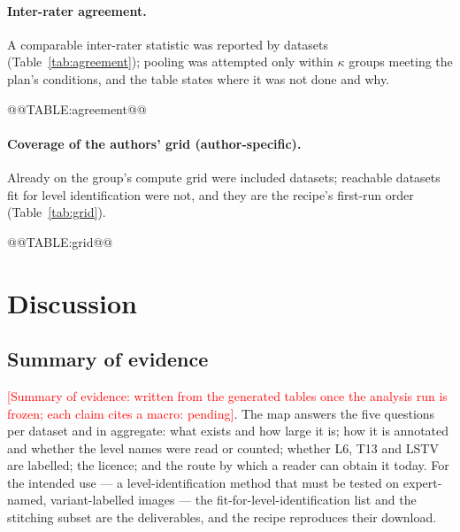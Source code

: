 \documentclass[11pt,a4paper]{article}
\newcommand{\pending}[1]{\textcolor{red}{[#1: pending]}}
\newcommand{\tabref}[1]{Table~\ref{tab:#1}}
\begin{document}
\paragraph{Inter-rater agreement.} A comparable inter-rater statistic was reported by \numwordAgreementDatasets{} datasets (\tabref{agreement}); pooling was attempted only within $\kappa$ groups meeting the plan's conditions, and the table states where it was not done and why.

@@TABLE:agreement@@

\paragraph{Coverage of the authors' grid (author-specific).} Already on the group's compute grid were \numwordOnGrid{} included datasets; \numwordReachableNotOnGrid{} reachable datasets fit for level identification were not, and they are the recipe's first-run order (\tabref{grid}).

@@TABLE:grid@@

\section{Discussion}

\subsection{Summary of evidence}\label{sec:summary}
\pending{Summary of evidence: written from the generated tables once the analysis run is frozen; each claim cites a macro}. The map answers the five questions per dataset and in aggregate: what exists and how large it is; how it is annotated and whether the level names were read or counted; whether L6, T13 and LSTV are labelled; the licence; and the route by which a reader can obtain it today. For the intended use --- a level-identification method that must be tested on expert-named, variant-labelled images --- the fit-for-level-identification list and the stitching subset are the deliverables, and the recipe reproduces their download.
\end{document}
